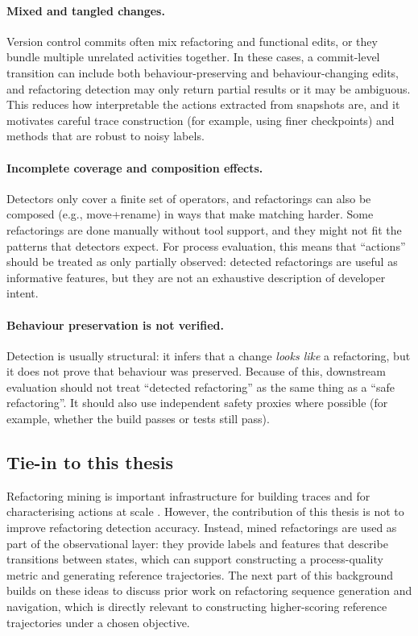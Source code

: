\paragraph{Mixed and tangled changes.}
Version control commits often mix refactoring and functional edits, or they bundle multiple unrelated activities together. In these cases, a commit-level transition can include both behaviour-preserving and behaviour-changing edits, and refactoring detection may only return partial results or it may be ambiguous. This reduces how interpretable the actions extracted from snapshots are, and it motivates careful trace construction (for example, using finer checkpoints) and methods that are robust to noisy labels.

\paragraph{Incomplete coverage and composition effects.}
Detectors only cover a finite set of operators, and refactorings can also be composed (e.g., move+rename) in ways that make matching harder. Some refactorings are done manually without tool support, and they might not fit the patterns that detectors expect. For process evaluation, this means that ``actions'' should be treated as only partially observed: detected refactorings are useful as informative features, but they are not an exhaustive description of developer intent.

\paragraph{Behaviour preservation is not verified.}
Detection is usually structural: it infers that a change \emph{looks like} a refactoring, but it does not prove that behaviour was preserved. Because of this, downstream evaluation should not treat ``detected refactoring'' as the same thing as a ``safe refactoring''. It should also use independent safety proxies where possible (for example, whether the build passes or tests still pass).


\subsection{Tie-in to this thesis}
Refactoring mining is important infrastructure for building traces and for characterising actions at scale \cite{tsantalis2020refactoringminer,silva2017refdiff}. However, the contribution of this thesis is not to improve refactoring detection accuracy. Instead, mined refactorings are used as part of the observational layer: they provide labels and features that describe transitions between states, which can support constructing a process-quality metric and generating reference trajectories. The next part of this background builds on these ideas to discuss prior work on refactoring sequence generation and navigation, which is directly relevant to constructing higher-scoring reference trajectories under a chosen objective.



